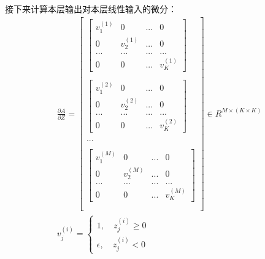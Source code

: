 \documentclass[UTF8]{article}
\begin{document}
接下来计算本层输出对本层线性输入的微分：
\begin{equation}
\begin{aligned}
\frac{\partial{A}}{\partial{Z}}=\begin{bmatrix}
\begin{bmatrix}
v_{1}^{(1)} & 0 & ... & 0 \\
 0 & v_{2}^{(1)} & ... & 0 \\
 ... & ... & ... & ... \\
 0 & 0 & ... & v_{K}^{(1)}
 \end{bmatrix} \\ \\
\begin{bmatrix}
v_{1}^{(2)} & 0 & ... & 0 \\
 0 & v_{2}^{(2)} & ... & 0 \\
 ... & ... & ... & ... \\
 0 & 0 & ... & v_{K}^{(2)}
 \end{bmatrix} \\ \\
 ... \\ \\
 \begin{bmatrix}
v_{1}^{(M)} & 0 & ... & 0 \\
 0 & v_{2}^{(M)} & ... & 0 \\
 ... & ... & ... & ... \\
 0 & 0 & ... & v_{K}^{(M)}
 \end{bmatrix} \\ \\
\end{bmatrix} \in R^{M \times (K \times K)} \\
 v_{j}^{(i)}=\begin{cases}
 1, \quad z_{j}^{(i)} \ge 0 \\
 \epsilon, \quad z_{j}^{(i)} < 0
 \end{cases}
\end{aligned}
\label{mlp-leaky-relu-pA-pZ-def}
\end{equation}
\end{document}
